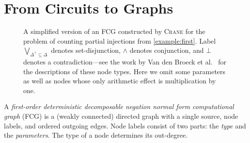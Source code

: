 \documentclass{article}
\theoremstyle{definition}
\DeclareMathOperator{\CR}{\textsc{CR}}
\DeclareMathOperator{\GDR}{\textsc{GDR}}
\DeclareMathOperator{\Reff}{\textsc{Ref}}
\begin{document}
\section{From Circuits to Graphs}\label{sec:methods}

\begin{figure}[t]
  \centering
  \caption{A simplified version of an FCG constructed by \textsc{Crane} for the
    problem of counting partial injections from \cref{example:first}. Label
    $\bigvee_{\Delta^\top \subseteq \Delta}$ denotes set-disjunction, $\land$
    denotes conjunction, and $\bot$ denotes a contradiction---see the work by
    Van den Broeck et al.~\protect{} for
    the descriptions of these node types. Here we omit some parameters as well
    as nodes whose only arithmetic effect is multiplication by
    one.}\label{fig:examplefcg}
\end{figure}


A \emph{first-order deterministic decomposable negation normal form
  computational graph} (FCG) is a (weakly connected) directed graph with a
single source, node labels, and ordered outgoing edges. Node
labels consist of two parts: the \emph{type} and the \emph{parameters}. The type
of a node determines its out-degree.

%
\end{document}
